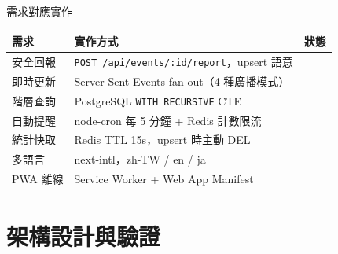 \documentclass[aspectratio=169,12pt]{beamer}
\newcommand{\cmark}{\ding{51}}
\begin{document}
\begin{frame}{需求對應實作}
\renewcommand{\arraystretch}{1.2}
\begin{tabularx}{\textwidth}{lXc}
\toprule
\textbf{需求} & \textbf{實作方式} & \textbf{狀態} \\
\midrule
安全回報 & \texttt{POST /api/events/:id/report}，upsert 語意 & \textcolor{msuccess}{\cmark} \\
即時更新 & Server-Sent Events fan-out（4 種廣播模式） & \textcolor{msuccess}{\cmark} \\
階層查詢 & PostgreSQL \texttt{WITH RECURSIVE} CTE & \textcolor{msuccess}{\cmark} \\
自動提醒 & node-cron 每 5 分鐘 + Redis 計數限流 & \textcolor{msuccess}{\cmark} \\
統計快取 & Redis TTL 15s，upsert 時主動 DEL & \textcolor{msuccess}{\cmark} \\
多語言   & next-intl，zh-TW / en / ja & \textcolor{msuccess}{\cmark} \\
PWA 離線 & Service Worker + Web App Manifest & \textcolor{msuccess}{\cmark} \\
\bottomrule
\end{tabularx}
\end{frame}

\section{架構設計與驗證}
\end{document}
